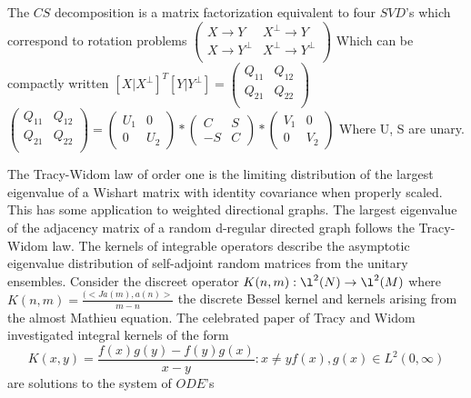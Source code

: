 \documentclass[a4paper]{article}
\theoremstyle{plain}
\theoremstyle{definition}
\theoremstyle{remark}
\numberwithin{equation}{section}
\begin{document}
The $CS$ decomposition is a matrix factorization equivalent to four $SVD$'s which correspond to rotation problems
$\left(\begin{array}{cc}
        X \rightarrow  Y & X^\perp \rightarrow  Y \\
        X \rightarrow  Y^\perp & X^\perp \rightarrow  Y^\perp \\
\end{array}\right)$
Which can be compactly written
$[X | X^\perp]^T [Y | Y^\perp ]=\left(
      \begin{array}{cc}
        Q_{11} & Q_{12} \\
        Q_{21} & Q_{22} \\
      \end{array}
\right)$
 $\left(
      \begin{array}{cc}
        Q_{11} & Q_{12} \\
        Q_{21} & Q_{22} \\
      \end{array}
\right)    = \left(
      \begin{array}{cc}
        U_1 & 0 \\
        0 & U_2
      \end{array}
\right) * \left(
      \begin{array}{cc}
        C & S \\
        -S & C
      \end{array}
\right) * \left(
      \begin{array}{cc}
        V_1 & 0 \\
        0 & V_2
      \end{array}
\right)
$
Where U, S are unary.

The Tracy-Widom law of order one is the limiting distribution of the largest eigenvalue of a Wishart matrix with identity covariance when properly scaled.  This has some application to weighted directional graphs.  The largest eigenvalue of the adjacency matrix of a random d-regular directed graph follows the Tracy-Widom law.  The kernels of integrable operators describe the asymptotic eigenvalue distribution of self-adjoint random matrices from the unitary ensembles. Consider the discreet operator $K(n,m):  \l^2(N) \rightarrow \l^2(M)$ where $K(n,m) = \frac{(<J a(m),a(n)>}{m-n}$ the discrete Bessel kernel and kernels arising from the almost Mathieu equation.  The celebrated paper of Tracy and Widom \cite{RMTTracy98correlationfunctions} investigated integral kernels of the form
\begin{equation*}
K(x,y)=\frac{f(x)g(y)-f(y)g(x)}{x-y} : x \neq y  f(x), g(x) \in L^2(0,\infty)
\end{equation*}
 are solutions to the system of $ODE$'s
\end{document}

